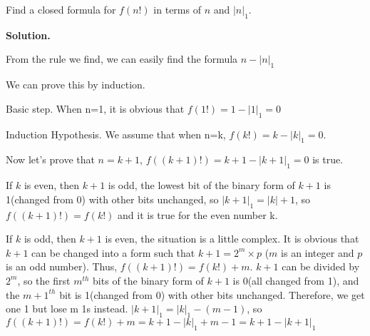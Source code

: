 
\begin{exercise}
   Find a closed formula for $f(n!)$ in terms of $n$ and $|n|_1$.

\textbf{Solution.}
\par From the rule we find, we can easily find the formula $n-|n|_1$
\par We can prove this by induction.
\par Basic step. When n=1, it is obvious that $f(1!)=1-|1|_1=0$
\par Induction Hypothesis. We assume that when n=k, $f(k!)=k-|k|_1=0$.
\par Now let's prove that $n=k+1$, $f((k+1)!)=k+1-|k+1|_1=0$ is true.
\par If $k$ is even, then $k+1$ is odd, the lowest bit of the binary form of $k+1$ is 1(changed from 0) with other bits unchanged, so $|k+1|_1=|k|+1$, so $f((k+1)!)=f(k!)$ and it is true for the even number k.
\par If $k$ is odd, then $k+1$ is even, the situation is a little complex. It is obvious that $k+1$ can be changed into a form such that $k+1=2^m\times p$ ($m$ is an integer and $p$ is an odd number). Thus, $f((k+1)!)=f(k!)+m$. $k+1$ can be divided by $2^m$, so the first $m^{th}$ bits of the binary form of $k+1$ is 0(all changed from 1), and the ${m+1}^{th}$ bit is 1(changed from 0) with other bits unchanged. Therefore, we get one 1 but lose m 1s instead. $|k+1|_1=|k|_1-(m-1)$, so $f((k+1)!)=f(k!)+m=k+1-|k|_1+m-1=k+1-|k+1|_1$
\end{exercise}
